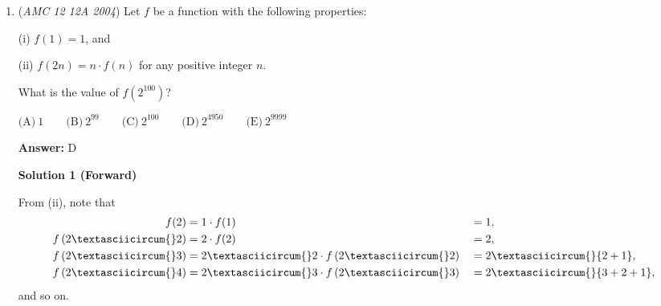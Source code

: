 \begin{enumerate}
\begin{enumerate}
        \item $\log_b a>c$ if and only if $a>b^c.$

            \end{enumerate}
            Therefore, we have
 \begin{align*} \log_{2004}(\log_{2003}(\log_{2002}(\log_{2001}{x}))) \text{ is defined} &\implies \log_{2003}(\log_{2002}(\log_{2001}{x}))>0 \\ &\implies \log_{2002}(\log_{2001}{x})>1 \\ &\implies \log_{2001}{x}>2002 \\ &\implies x>2001^{2002}, \end{align*}
from which $c=\boxed{\textbf {(B) }2001^{2002}}.$




\textbf{Solution 2}

Let
 \begin{align*} x &= 2001^a, \\ a &= 2002^b, \\ b &= 2003^c, \\ c &= 2004^d. \end{align*}
It follows that 
 \[x = 2001^{2002^{2003^{2004^d}}}.\]The smallest value of $x$ occurs when $d\rightarrow -\infty,$ so this expression becomes
 \[x = 2001^{2002^{2003^0}} = 2001^{2002^1} = \boxed{\textbf {(B) }2001^{2002}}.\]



	\item (\textit{AMC 12 12A 2004}) Let $f$ be a function with the following properties:


 (i) $f(1) = 1$, and


 (ii) $f(2n) = n \cdot f(n)$ for any positive integer $n$.


 What is the value of $f(2^{100})$?


 $\text {(A)}\ 1 \qquad \text {(B)}\ 2^{99} \qquad \text {(C)}\ 2^{100} \qquad \text {(D)}\ 2^{4950} \qquad \text {(E)}\ 2^{9999}$

 \textbf{Answer: }D



\textbf{Solution 1 (Forward)}

From (ii), note that
 \begin{alignat*}{8} f(2) &= 1\cdot f(1) &&= 1, \\  f\left(2\textasciicircum{}2\right) &= 2\cdot f(2)  &&= 2, \\  f\left(2\textasciicircum{}3\right) &= 2\textasciicircum{}2\cdot f\left(2\textasciicircum{}2\right) &&= 2\textasciicircum{}{2+1}, \\ f\left(2\textasciicircum{}4\right) &= 2\textasciicircum{}3\cdot f\left(2\textasciicircum{}3\right) &&= 2\textasciicircum{}{3+2+1}, \end{alignat*}and so on.


\end{enumerate}
